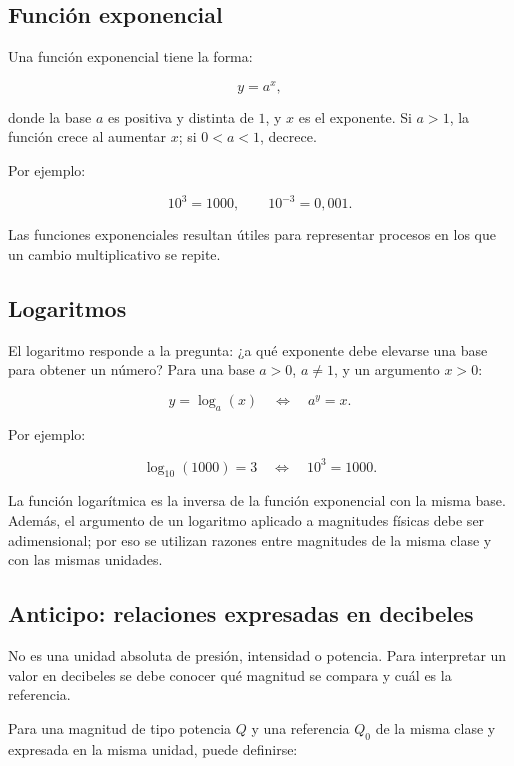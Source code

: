 \subsection{Función exponencial}
\label{sec:u1-exponencial}

Una función exponencial tiene la forma:

\[
    y=a^{x},
\]

donde la base \(a\) es positiva y distinta de \(1\), y \(x\) es el exponente. Si \(a>1\), la función crece al aumentar \(x\); si \(0<a<1\), decrece.

Por ejemplo:

\[
    10^{3}=1000,
    \qquad
    10^{-3}=0{,}001.
\]

Las funciones exponenciales resultan útiles para representar procesos en los que un cambio multiplicativo se repite.

\subsection{Logaritmos}
\label{sec:u1-logaritmos}

El logaritmo responde a la pregunta: ¿a qué exponente debe elevarse una base para obtener un número? Para una base \(a>0\), \(a\neq1\), y un argumento \(x>0\):

\[
    y=\log_{a}(x)
    \quad\Longleftrightarrow\quad
    a^{y}=x.
\]

Por ejemplo:

\[
    \log_{10}(1000)=3
    \quad\Longleftrightarrow\quad
    10^{3}=1000.
\]

La función logarítmica es la inversa de la función exponencial con la misma base. Además, el argumento de un logaritmo aplicado a magnitudes físicas debe ser adimensional; por eso se utilizan razones entre magnitudes de la misma clase y con las mismas unidades.

\subsection{Anticipo: relaciones expresadas en decibeles}
\label{sec:u1-decibel}

 No es una unidad absoluta de presión, intensidad o potencia. Para interpretar un valor en decibeles se debe conocer qué magnitud se compara y cuál es la referencia.

Para una magnitud de tipo potencia \(Q\) y una referencia \(Q_0\) de la misma clase y expresada en la misma unidad, puede definirse:

